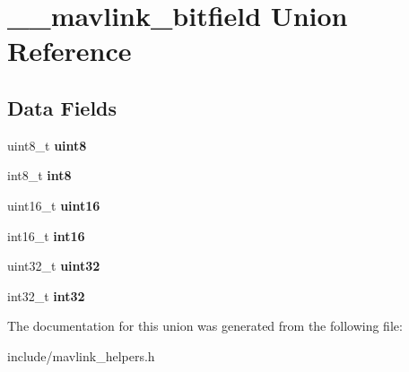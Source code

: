 \hypertarget{union____mavlink__bitfield}{}\section{\+\_\+\+\_\+mavlink\+\_\+bitfield Union Reference}
\label{union____mavlink__bitfield}
\subsection*{Data Fields}
\begin{DoxyCompactItemize}
\item 
uint8\+\_\+t {\bfseries uint8}\hypertarget{union____mavlink__bitfield_a41e2d0b297f5214535b655804a009618}{}\label{union____mavlink__bitfield_a41e2d0b297f5214535b655804a009618}

\item 
int8\+\_\+t {\bfseries int8}\hypertarget{union____mavlink__bitfield_ae0a430ab8199def132f3f07af5c84066}{}\label{union____mavlink__bitfield_ae0a430ab8199def132f3f07af5c84066}

\item 
uint16\+\_\+t {\bfseries uint16}\hypertarget{union____mavlink__bitfield_aedb868422c8a1ea1fdb3ea39ea6de1b9}{}\label{union____mavlink__bitfield_aedb868422c8a1ea1fdb3ea39ea6de1b9}

\item 
int16\+\_\+t {\bfseries int16}\hypertarget{union____mavlink__bitfield_a7cd86ccaa2b7be3ef15423f3f58e929e}{}\label{union____mavlink__bitfield_a7cd86ccaa2b7be3ef15423f3f58e929e}

\item 
uint32\+\_\+t {\bfseries uint32}\hypertarget{union____mavlink__bitfield_a5ad776be1fb768f3399aafcd1b58b3a2}{}\label{union____mavlink__bitfield_a5ad776be1fb768f3399aafcd1b58b3a2}

\item 
int32\+\_\+t {\bfseries int32}\hypertarget{union____mavlink__bitfield_a4f658422e832e5e2d56e2245cb84be84}{}\label{union____mavlink__bitfield_a4f658422e832e5e2d56e2245cb84be84}

\end{DoxyCompactItemize}


The documentation for this union was generated from the following file\+:\begin{DoxyCompactItemize}
\item 
include/mavlink\+\_\+helpers.\+h\end{DoxyCompactItemize}
